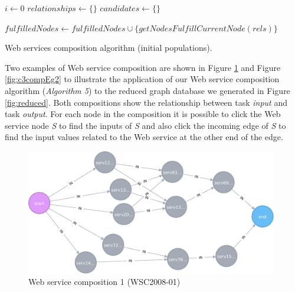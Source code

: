 \begin{algorithm}[H]
 \LinesNumbered
 \SetNlSty{}{}{:}
   $i \leftarrow 0$\;
   $relationships \leftarrow \{\}$\;
   $candidates \leftarrow \{\}$\; 

   $fulfilledNodes \leftarrow fulfilledNodes \cup \{getNodesFulfillCurrentNode(rels)\}$\;
 \caption{\footnotesize Web services composition algorithm (initial populations).}
\label{generation}
\end{algorithm}
\setlength{\textfloatsep}{20pt}%

Two examples of Web service composition are shown in Figure \ref{fig:c3compEg1} and Figure \ref{fig:c3compEg2} to illustrate the application of our Web service composition algorithm (\emph{Algorithm 5}) to the reduced graph database we generated in Figure \ref{fig:reduced}. Both compositions show the relationship between task \emph{input} and task \emph{output}. For each node in the composition it is possible to click the Web service node \emph{S} to find the inputs of \emph{S} and also click the incoming edge of \emph{S} to find the input values related to the Web service at the other end of the edge. \par
\begin{figure}[H]
\includegraphics[width=11cm]{svg-chapter3-c1.pdf}
\centering
\caption{Web service composition 1 (WSC2008-01)}
\label{fig:c3compEg1} 
\end{figure} 

